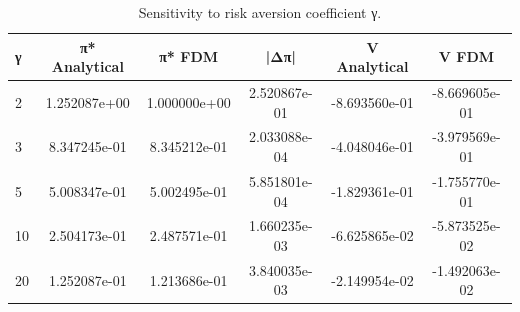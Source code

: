 \begin{table}[ht]
\centering
\caption{Sensitivity to risk aversion coefficient γ.}
\label{tab:sensitivity_gamma}
\begin{tabular}{lccccc}
\toprule
γ & π* Analytical & π* FDM & |Δπ| & V Analytical & V FDM \\
\midrule
2 & 1.252087e+00 & 1.000000e+00 & 2.520867e-01 & -8.693560e-01 & -8.669605e-01 \\
3 & 8.347245e-01 & 8.345212e-01 & 2.033088e-04 & -4.048046e-01 & -3.979569e-01 \\
5 & 5.008347e-01 & 5.002495e-01 & 5.851801e-04 & -1.829361e-01 & -1.755770e-01 \\
10 & 2.504173e-01 & 2.487571e-01 & 1.660235e-03 & -6.625865e-02 & -5.873525e-02 \\
20 & 1.252087e-01 & 1.213686e-01 & 3.840035e-03 & -2.149954e-02 & -1.492063e-02 \\
\bottomrule
\end{tabular}
\end{table}